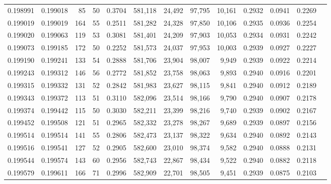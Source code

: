 \begin{tabular}{rrrrrrrrrrrrr}
0.198991 & 0.199018 &    85 &  50 &                                     0.3704 & 581,118 &  24,492 &  97,795 &  10,161 & 0.2932 & 0.0941 & 0.2269 \\
0.199019 & 0.199019 &   164 &  55 &                                     0.2511 & 581,282 &  24,328 &  97,850 &  10,106 & 0.2935 & 0.0936 & 0.2254 \\
0.199020 & 0.199063 &   119 &  53 &                                     0.3081 & 581,401 &  24,209 &  97,903 &  10,053 & 0.2934 & 0.0931 & 0.2242 \\
0.199073 & 0.199185 &   172 &  50 &                                     0.2252 & 581,573 &  24,037 &  97,953 &  10,003 & 0.2939 & 0.0927 & 0.2227 \\
0.199190 & 0.199241 &   133 &  54 &                                     0.2888 & 581,706 &  23,904 &  98,007 &   9,949 & 0.2939 & 0.0922 & 0.2214 \\
0.199243 & 0.199312 &   146 &  56 &                                     0.2772 & 581,852 &  23,758 &  98,063 &   9,893 & 0.2940 & 0.0916 & 0.2201 \\
0.199315 & 0.199332 &   131 &  52 &                                     0.2842 & 581,983 &  23,627 &  98,115 &   9,841 & 0.2940 & 0.0912 & 0.2189 \\
0.199343 & 0.199372 &   113 &  51 &                                     0.3110 & 582,096 &  23,514 &  98,166 &   9,790 & 0.2940 & 0.0907 & 0.2178 \\
0.199374 & 0.199442 &   115 &  50 &                                     0.3030 & 582,211 &  23,399 &  98,216 &   9,740 & 0.2939 & 0.0902 & 0.2167 \\
0.199452 & 0.199508 &   121 &  51 &                                     0.2965 & 582,332 &  23,278 &  98,267 &   9,689 & 0.2939 & 0.0897 & 0.2156 \\
0.199514 & 0.199514 &   141 &  55 &                                     0.2806 & 582,473 &  23,137 &  98,322 &   9,634 & 0.2940 & 0.0892 & 0.2143 \\
0.199516 & 0.199541 &   127 &  52 &                                     0.2905 & 582,600 &  23,010 &  98,374 &   9,582 & 0.2940 & 0.0888 & 0.2131 \\
0.199544 & 0.199574 &   143 &  60 &                                     0.2956 & 582,743 &  22,867 &  98,434 &   9,522 & 0.2940 & 0.0882 & 0.2118 \\
0.199579 & 0.199611 &   166 &  71 &                                     0.2996 & 582,909 &  22,701 &  98,505 &   9,451 & 0.2939 & 0.0875 & 0.2103 \\

\end{tabular}
